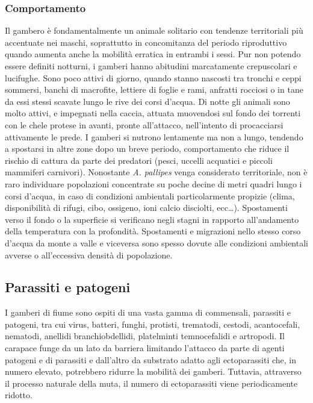 \documentclass[11pt,a4paper,italian,twoside,openany]{memoir}
\begin{document}
\subsubsection{Comportamento}
Il gambero è fondamentalmente un animale solitario con tendenze territoriali più accentuate nei maschi, soprattutto in concomitanza del periodo riproduttivo quando aumenta anche la mobilità erratica in entrambi i sessi. Pur non potendo essere definiti notturni, i gamberi hanno abitudini marcatamente crepuscolari e lucifughe. Sono poco attivi di giorno, quando stanno nascosti tra tronchi e ceppi sommersi, banchi di macrofite, lettiere di foglie e rami, anfratti rocciosi o in tane da essi stessi scavate lungo le rive dei corsi d'acqua. Di notte gli animali sono molto attivi, e impegnati nella caccia, attuata muovendosi sul fondo dei torrenti con le chele protese in avanti, pronte all'attacco, nell'intento di procacciarsi attivamente le prede. I gamberi si nutrono lentamente ma non a lungo, tendendo a spostarsi in altre zone dopo un breve periodo, comportamento che riduce il rischio di cattura da parte dei predatori (pesci, uccelli acquatici e piccoli mammiferi carnivori).
Nonostante \emph{A. pallipes} venga considerato territoriale, non è raro individuare popolazioni concentrate su poche decine di metri quadri lungo i corsi d'acqua, in caso di condizioni ambientali particolarmente propizie (clima, disponibilità di rifugi, cibo, ossigeno, ioni calcio disciolti, ecc…). Spostamenti verso il fondo o la superficie si verificano negli stagni in rapporto all'andamento della temperatura con la profondità. Spostamenti e migrazioni nello stesso corso d'acqua da monte a valle e viceversa sono spesso dovute alle condizioni ambientali avverse o all'eccessiva densità di popolazione.

\subsection{Parassiti e patogeni} 
I gamberi di fiume sono ospiti di una vasta gamma di commensali, parassiti e patogeni, tra cui virus, batteri, funghi, protisti, trematodi, cestodi, acantocefali, nematodi, anellidi branchiobdellidi, platelminti temnocefalidi e artropodi. Il carapace funge da un lato da barriera limitando l'attacco da parte di agenti patogeni e di parassiti e dall'altro da substrato adatto agli ectoparassiti che, in numero elevato, potrebbero ridurre la mobilità dei gamberi. Tuttavia, attraverso il processo naturale della muta, il numero di ectoparassiti viene periodicamente ridotto.
\end{document}
